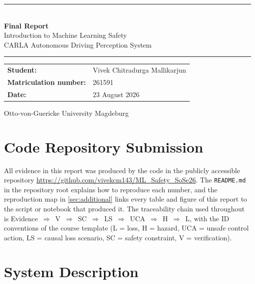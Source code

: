 \documentclass[a4paper,12pt]{article}
\begin{document}
\begin{titlepage}
\thispagestyle{empty}
\centering
\vspace*{2.5cm}

{\color{mls@blue}\rule{\linewidth}{2pt}}\\[1.2em]
{\color{mls@blue}\Huge\bfseries Final Report}\\[0.8em]
{\LARGE Introduction to Machine Learning Safety}\\[0.6em]
{\large\color{mls@gray}CARLA Autonomous Driving Perception System}\\[1.2em]
{\color{mls@blue}\rule{\linewidth}{2pt}}

\vspace{3.5cm}

\noindent
\begin{tabularx}{\linewidth}{@{}l X@{}}
  \textbf{Student:}              & Vivek Chitradurga Mallikarjun \\[1.2em]
  \textbf{Matriculation number:} & 261591 \\[1.2em]
  \textbf{Date:}                 & 23 August 2026 \\
\end{tabularx}

\vfill
{\color{mls@gray}\small Otto-von-Guericke University Magdeburg}
\end{titlepage}


\clearpage
\tableofcontents


\section*{Code Repository Submission}

All evidence in this report was produced by the code in the publicly accessible repository
\url{https://github.com/vivekcm143/ML_Safety_SoSe26}. The \texttt{README.md} in the
repository root explains how to reproduce each number, and the reproduction map in
\cref{sec:additional} links every table and figure of this report to the script or
notebook that produced it. The traceability chain used throughout is
\mbox{Evidence $\Rightarrow$ V $\Rightarrow$ SC $\Rightarrow$ LS $\Rightarrow$ UCA
$\Rightarrow$ H $\Rightarrow$ L}, with the ID conventions of the course template
(L = loss, H = hazard, UCA = unsafe control action, LS = causal loss scenario,
SC = safety constraint, V = verification).

\section{System Description}
\label{sec:system-description}
\end{document}
